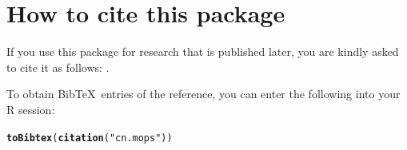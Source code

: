 \documentclass[article]{bioinf}\usepackage[]{graphicx}\usepackage[]{color}
\makeatletter
\newcommand{\hlstr}[1]{\textcolor[rgb]{0.192,0.494,0.8}{#1}}%
\newcommand{\hlstd}[1]{\textcolor[rgb]{0.345,0.345,0.345}{#1}}%
\newcommand{\hlkwd}[1]{\textcolor[rgb]{0.737,0.353,0.396}{\textbf{#1}}}%
\newenvironment{kframe}{%
 \def\at@end@of@kframe{}%
 \ifinner\ifhmode%
  \def\at@end@of@kframe{\end{minipage}}%
  \begin{minipage}{\columnwidth}%
 \fi\fi%
 \def\FrameCommand##1{\hskip\@totalleftmargin \hskip-\fboxsep
 \colorbox{shadecolor}{##1}\hskip-\fboxsep
     \hskip-\linewidth \hskip-\@totalleftmargin \hskip\columnwidth}%
 \MakeFramed {\advance\hsize-\width
   \@totalleftmargin\z@ \linewidth\hsize
   \@setminipage}}%
 {\par\unskip\endMakeFramed%
 \at@end@of@kframe}
\newenvironment{knitrout}{}{} %
\makeatother
\begin{document}


\section{How to cite this package}

If you use this package for research that is published later, you are kindly
asked to cite it as follows:
\citep{Klambauer:11}.

To obtain Bib\TeX\ entries of the reference, you can enter the following
into your R session:
\begin{knitrout}
\color{fgcolor}\begin{kframe}
\begin{alltt}
\hlkwd{toBibtex}\hlstd{(}\hlkwd{citation}\hlstd{(}\hlstr{"cn.mops"}\hlstd{))}
\end{alltt}
\end{kframe}
\end{knitrout}




\end{document}
